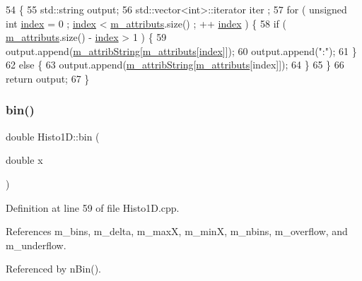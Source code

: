 \begin{DoxyCode}
54                             \{
55   std::string output;
56   std::vector<int>::iterator iter ;
57   \textcolor{keywordflow}{for} ( \textcolor{keywordtype}{unsigned} \textcolor{keywordtype}{int} \hyperlink{namespaceimages_a54407fd574970b3178647ae096321a57}{index} = 0 ; \hyperlink{namespaceimages_a54407fd574970b3178647ae096321a57}{index} < \hyperlink{classAttrib_ac4bd58a0cc6b38a3b711d609a3d3aacc}{m\_attributs}.size() ; ++
      \hyperlink{namespaceimages_a54407fd574970b3178647ae096321a57}{index} ) \{
58     \textcolor{keywordflow}{if} ( \hyperlink{classAttrib_ac4bd58a0cc6b38a3b711d609a3d3aacc}{m\_attributs}.size() - \hyperlink{namespaceimages_a54407fd574970b3178647ae096321a57}{index} > 1 ) \{
59       output.append(\hyperlink{classAttrib_a3414521d7a82476e874b25a5407b5e63}{m\_attribString}[\hyperlink{classAttrib_ac4bd58a0cc6b38a3b711d609a3d3aacc}{m\_attributs}[\hyperlink{namespaceimages_a54407fd574970b3178647ae096321a57}{index}]]);
60       output.append(\textcolor{stringliteral}{":"});
61     \}
62     \textcolor{keywordflow}{else} \{
63       output.append(\hyperlink{classAttrib_a3414521d7a82476e874b25a5407b5e63}{m\_attribString}[\hyperlink{classAttrib_ac4bd58a0cc6b38a3b711d609a3d3aacc}{m\_attributs}[index]]);
64     \}
65   \}
66   \textcolor{keywordflow}{return} output;
67 \}
\end{DoxyCode}
\mbox{\label{classHisto1D_a2a8a7d93c2f10b73b490a6f550e00db4}} 
\subsubsection{\texorpdfstring{bin()}{bin()}}
{\footnotesize\ttfamily double Histo1\+D\+::bin (\begin{DoxyParamCaption}\item[{double}]{x }\end{DoxyParamCaption})}



Definition at line 59 of file Histo1\+D.\+cpp.



References m\+\_\+bins, m\+\_\+delta, m\+\_\+maxX, m\+\_\+minX, m\+\_\+nbins, m\+\_\+overflow, and m\+\_\+underflow.



Referenced by n\+Bin().


